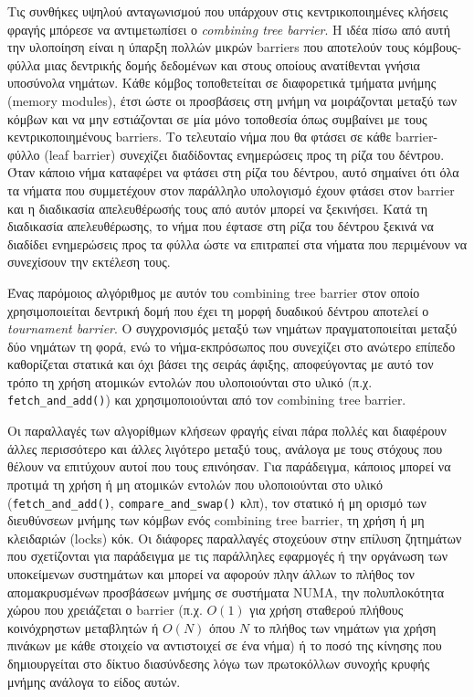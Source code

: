Τις συνθήκες υψηλού ανταγωνισμού που υπάρχουν στις κεντρικοποιημένες κλήσεις φραγής μπόρεσε να αντιμετωπίσει ο \textit{combining tree barrier}. Η ιδέα πίσω από αυτή την υλοποίηση είναι η ύπαρξη πολλών μικρών barriers που αποτελούν τους κόμβους-φύλλα μιας δεντρικής δομής δεδομένων και στους οποίους ανατίθενται γνήσια υποσύνολα νημάτων. Κάθε κόμβος τοποθετείται σε διαφορετικά τμήματα μνήμης (memory modules), έτσι ώστε οι προσβάσεις στη μνήμη να μοιράζονται μεταξύ των κόμβων και να μην εστιάζονται σε μία μόνο τοποθεσία όπως συμβαίνει με τους κεντρικοποιημένους barriers. Το τελευταίο νήμα που θα φτάσει σε κάθε barrier-φύλλο (leaf barrier) συνεχίζει διαδίδοντας ενημερώσεις προς τη ρίζα του δέντρου. Όταν κάποιο νήμα καταφέρει να φτάσει στη ρίζα του δέντρου, αυτό σημαίνει ότι όλα τα νήματα που συμμετέχουν στον παράλληλο υπολογισμό έχουν φτάσει στον barrier και η διαδικασία απελευθέρωσής τους από αυτόν μπορεί να ξεκινήσει. Κατά τη διαδικασία απελευθέρωσης, το νήμα που έφτασε στη ρίζα του δέντρου ξεκινά να διαδίδει ενημερώσεις προς τα φύλλα ώστε να επιτραπεί στα νήματα που περιμένουν να συνεχίσουν την εκτέλεση τους.

Ένας παρόμοιος αλγόριθμος με αυτόν του combining tree barrier στον οποίο χρησιμοποιείται δεντρική δομή που έχει τη μορφή δυαδικού δέντρου αποτελεί ο \textit{tournament barrier}. Ο συγχρονισμός μεταξύ των νημάτων πραγματοποιείται μεταξύ δύο νημάτων τη φορά, ενώ το νήμα-εκπρόσωπος που συνεχίζει στο ανώτερο επίπεδο καθορίζεται στατικά και όχι βάσει της σειράς άφιξης, αποφεύγοντας με αυτό τον τρόπο τη χρήση ατομικών εντολών που υλοποιούνται στο υλικό (π.χ. \texttt{fetch\_and\_add()}) και χρησιμοποιούνται από τον combining tree barrier.

Οι παραλλαγές των αλγορίθμων κλήσεων φραγής είναι πάρα πολλές και διαφέρουν άλλες περισσότερο και άλλες λιγότερο μεταξύ τους, ανάλογα με τους στόχους που θέλουν να επιτύχουν αυτοί που τους επινόησαν. Για παράδειγμα, κάποιος μπορεί να προτιμά τη χρήση ή μη ατομικών εντολών που υλοποιούνται στο υλικό (\texttt{fetch\_and\_add()}, \texttt{compare\_and\_swap()} κλπ), τον στατικό ή μη ορισμό των διευθύνσεων μνήμης των κόμβων ενός combining tree barrier, τη χρήση ή μη κλειδαριών (locks) κόκ. Οι διάφορες παραλλαγές στοχεύουν στην επίλυση ζητημάτων που σχετίζονται για παράδειγμα με τις παράλληλες εφαρμογές ή την οργάνωση των υποκείμενων συστημάτων και μπορεί να αφορούν πλην άλλων το πλήθος τον απομακρυσμένων προσβάσεων μνήμης σε συστήματα NUMA, την πολυπλοκότητα χώρου που χρειάζεται ο barrier (π.χ. $O(1)$ για χρήση σταθερού πλήθους κοινόχρηστων μεταβλητών ή $O(N)$ όπου $N$ το πλήθος των νημάτων για χρήση πινάκων με κάθε στοιχείο να αντιστοιχεί σε ένα νήμα) ή το ποσό της κίνησης που δημιουργείται στο δίκτυο διασύνδεσης λόγω των πρωτοκόλλων συνοχής κρυφής μνήμης ανάλογα το είδος αυτών.


